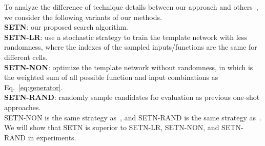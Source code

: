 \documentclass[10pt,twocolumn,letterpaper]{article}
\def\Eqref#1{{Eq.~\eqref{#1}}}
\def\NAME{{SETN}}
\begin{document}
To analyze the difference of technique details between our approach and others~\cite{liu2019darts}, we consider the following variants of our methods. \\
\textbf{{\NAME}}: our proposed search algorithm.\\
\textbf{{\NAME}-LR}: use a stochastic strategy to train the template network with less randomness, where the indexes of the sampled inputs/functions are the same for different cells.\\
\textbf{{\NAME}-NON}: optimize the template network without randomness, in which  is the weighted sum of all possible function and input combinations as \Eqref{eq:generator}.\\
\textbf{{\NAME}-RAND}: randomly sample candidates for evaluation as previous one-shot approaches.\\
{\NAME}-NON is the same strategy as~\cite{liu2019darts}, and {\NAME}-RAND is the same strategy as~\cite{bender2018understanding,brock2018smash}.
We will show that {\NAME} is superior to {\NAME}-LR, {\NAME}-NON, and {\NAME}-RAND in experiments.
\end{document}
